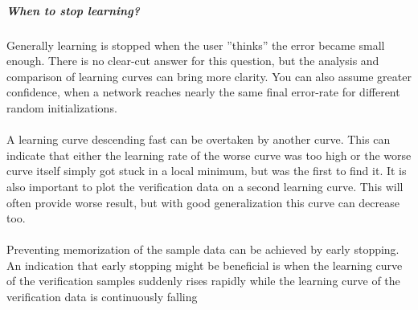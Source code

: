 \documentclass[pdftex,a4paper,12pt,twoside]{report}
\theoremstyle{plain} \newtheorem{theorem}{Theorem} \newtheorem{proposition}{Proposition} \newtheorem{lemma}{Lemma} \newtheorem*{corollary}{Corollary}
\theoremstyle{definition} \newtheorem{definition}{Definition} \newtheorem{conjecture}{Conjecture} \newtheorem*{example}{Example} \newtheorem{algorithm}{Algorithm}
\theoremstyle{remark} \newtheorem*{remark}{Remark} \newtheorem*{note}{Note} \newtheorem{case}{Case}
\begin{document}
\subparagraph{When to stop learning?}
Generally learning is stopped when the user ''thinks'' the error became small enough. There is no clear-cut answer for this question, but the analysis and comparison of learning curves can bring more clarity. You can also assume greater confidence, when a network reaches nearly the same final error-rate for different random initializations.\\\\A learning curve descending fast can be overtaken by another curve. This can indicate that either the learning rate of the worse curve was too high or the worse curve itself simply got stuck in a local minimum, but was the first to find it. It is also important to plot the verification data on a second learning curve. This will often provide worse result, but with good generalization this curve can decrease too.\\\\Preventing memorization of the sample data can be achieved by early stopping. An indication that early stopping might be beneficial is when the learning curve of the verification samples suddenly rises rapidly while the learning curve of the verification data is continuously falling
\end{document}
